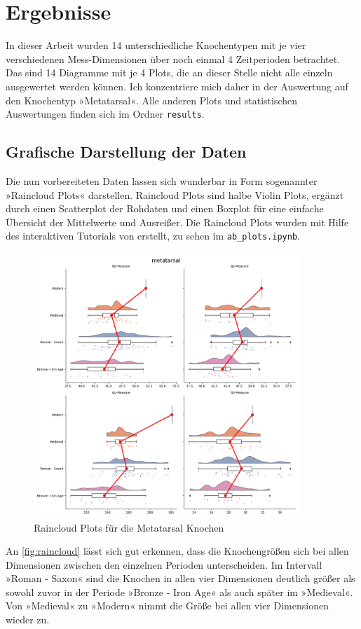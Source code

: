 \section{Ergebnisse}
In dieser Arbeit wurden 14 unterschiedliche Knochentypen mit je vier verschiedenen Mess-Dimensionen über noch einmal 4 Zeitperioden betrachtet. 
Das sind 14 Diagramme mit je 4 Plots, die an dieser Stelle nicht alle einzeln ausgewertet werden können. 
Ich konzentriere mich daher in der Auswertung auf den Knochentyp »Metatarsal«.
Alle anderen Plots und statistischen Auswertungen finden sich im Ordner \texttt{results}. 

\subsection{Grafische Darstellung der Daten}
Die nun vorbereiteten Daten lassen sich wunderbar in Form sogenannter »Raincloud Plots«\cite{Allen2021} darstellen. Raincloud Plots sind halbe Violin Plots, ergänzt durch einen Scatterplot der Rohdaten und einen Boxplot für eine einfache Übersicht der Mittelwerte und Ausreißer. 
Die Raincloud Plots wurden mit Hilfe des interaktiven Tutorials von \cite{Allen2021} erstellt, zu sehen im \texttt{ab\_plots.ipynb}.

\begin{figure}[H]
    \centering
    \includegraphics[height=10cm]{results/plots/rainclouds/metatarsal.png}
    \caption{Raincloud Plots für die Metatarsal Knochen}
    \label{fig:raincloud}
\end{figure}

An \autoref{fig:raincloud} lässt sich gut erkennen, dass die Knochengrößen sich bei allen Dimensionen zwischen den einzelnen Perioden unterscheiden. 
Im Intervall »Roman - Saxon« sind die Knochen in allen vier Dimensionen deutlich größer als sowohl zuvor in der Periode »Bronze - Iron Age« als auch später im »Medieval«. 
Von »Medieval« zu »Modern« nimmt die Größe bei allen vier Dimensionen wieder zu.

